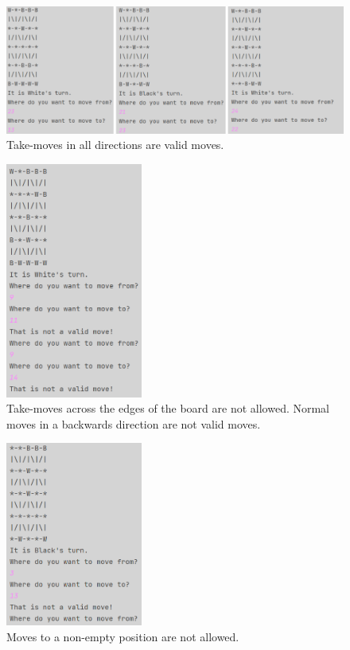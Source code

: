\documentclass[12pt, a4paper]{article}
\begin{document}
\begin{figure}[h]
	\centering
	\caption*{Take-moves in all directions are valid moves.}
	\includegraphics[width=1\textwidth]{isLegalProf/3in1.png}	
\end{figure}

\begin{figure}[h]
	\centering
	\caption*{Take-moves across the edges of the board are not allowed. Normal moves in a backwards direction are not valid moves.}
	\includegraphics[width=0.4\textwidth]{isLegalProf/IkkeRykkeBagudEllerOutOfBounds.png}	
\end{figure}

\begin{figure}[h]
	\centering
	\caption*{Moves to a non-empty position are not allowed.}
	\includegraphics[width=0.4\textwidth]{isLegalProf/MåIkkeRykkeTilFelterDerStårEnBrik.png}	
\end{figure}
\clearpage
\end{document}
